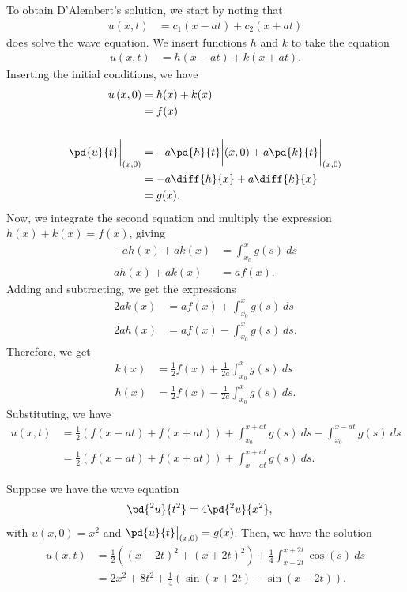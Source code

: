 \documentclass[10pt]{mypackage}
\begin{document}
To obtain D'Alembert's solution, we start by noting that
\begin{align*}
  u\left( x,t \right) &= c_1\left( x-at \right) + c_2\left( x + at \right)
\end{align*}
does solve the wave equation. We insert functions $h$ and $k$ to take the equation
\begin{align*}
  u\left( x,t \right) &= h\left( x-at \right) + k\left( x + at \right).
\end{align*}
Inserting the initial conditions, we have
\begin{align*}
  u\left( x,0 \right) &= h(x) + k(x)\\
                      &= f(x)\\
                      \\
  \pd{u}{t}\biggr\vert_{(x,0)} &= -a \pd{h}{t}\biggr\vert(x,0) + a \pd{k}{t}\biggr\vert_{(x,0)}\\
                               &= -a\diff{h}{x} + a\diff{k}{x}\\
                               &= g(x).
\end{align*}
Now, we integrate the second equation and multiply the expression $h(x) + k(x) = f(x)$, giving
\begin{align*}
  -a h(x) + ak(x) &= \int_{x_0}^{x} g(s)\:ds\\
  ah(x) + ak(x) &= af(x).
\end{align*}
Adding and subtracting, we get the expressions
\begin{align*}
  2ak(x) &= af(x) + \int_{x_0}^{x} g(s)\:ds\\
  2ah(x) &= af(x) - \int_{x_0}^{x} g(s)\:ds.
\end{align*}
Therefore, we get
\begin{align*}
  k(x) &= \frac{1}{2}f(x) + \frac{1}{2a}\int_{x_0}^{x} g(s)\:ds\\
  h(x) &= \frac{1}{2}f(x) - \frac{1}{2a} \int_{x_0}^{x} g(s)\:ds.
\end{align*}
Substituting, we have
\begin{align*}
  u\left( x,t \right) &= \frac{1}{2} \left( f(x-at) + f(x + at) \right) + \int_{x_0}^{x+at} g(s)\:ds - \int_{x_0}^{x-at} g(s)\:ds\\
                      &= \frac{1}{2}\left( f(x-at) + f(x+at) \right) + \int_{x-at}^{x + at} g(s)\:ds.
\end{align*}
\begin{example}
  Suppose we have the wave equation
  \begin{align*}
    \pd{^2u}{t^2} &= 4\pd{^2u}{x^2},
  \end{align*}
  with $u\left( x,0 \right) = x^2$ and $\pd{u}{t}\bigr\vert_{(x,0)} = g(x)$. Then, we have the solution
  \begin{align*}
    u\left( x,t \right) &= \frac{1}{2}\left( \left( x-2t \right)^2 + \left( x + 2t \right)^2 \right) + \frac{1}{4}\int_{x-2t}^{x+2t} \cos\left( s \right)\:ds\\
                        &= 2x^2 + 8t^2 + \frac{1}{4}\left( \sin\left( x+2t \right) - \sin\left( x - 2t \right) \right).
  \end{align*}
\end{example}
\end{document}
